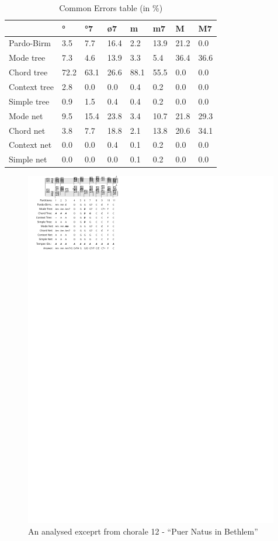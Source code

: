 \documentclass{article}
\begin{document}
\begin{table}
  \centering
  \begin{tabular}{l|lllllll}
                 &   °&  °7&  ø7&   m&  m7&   M&  M7\\
    \hline
    Pardo-Birm   & 3.5& 7.7&16.4& 2.2&13.9&21.2& 0.0\\
    Mode tree    & 7.3& 4.6&13.9& 3.3& 5.4&36.4&36.6\\
    Chord tree   &72.2&63.1&26.6&88.1&55.5& 0.0& 0.0\\
    Context tree & 2.8& 0.0& 0.0& 0.4& 0.2& 0.0& 0.0\\
    Simple tree  & 0.9& 1.5& 0.4& 0.4& 0.2& 0.0& 0.0\\
    Mode net     & 9.5&15.4&23.8& 3.4&10.7&21.8&29.3\\
    Chord net    & 3.8& 7.7&18.8& 2.1&13.8&20.6&34.1\\
    Context net  & 0.0& 0.0& 0.4& 0.1& 0.2& 0.0& 0.0\\
    Simple net   & 0.0& 0.0& 0.0& 0.1& 0.2& 0.0& 0.0\\
  \end{tabular}
  \caption{Common Errors table (in \%)}
  \label{tab:common-errors}
\end{table}


\begin{figure}
  \centering
  \includegraphics[scale=4]{coral-012}
  \caption{An analysed exceprt from chorale 12 - ``Puer Natus in Bethlem''}
  \label{fig:coral-12}
\end{figure}
\end{document}
